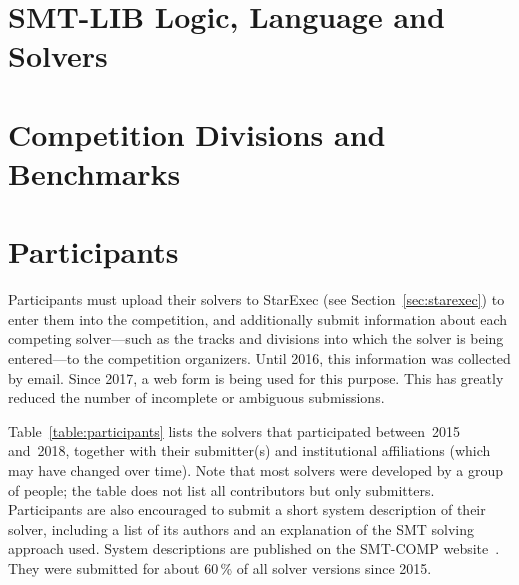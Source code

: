 \documentclass[twoside,11pt]{article}
\begin{document}
\section{SMT-LIB Logic, Language and Solvers}
\label{sec:context}


\section{Competition Divisions and Benchmarks}
\label{sec:benchmarks}


\section{Participants}
\label{sec:participants}

Participants must upload their solvers to StarExec (see
Section~\ref{sec:starexec}) to enter them into the competition, and
additionally submit information about each competing solver---such as
the tracks and divisions into which the solver is being entered---to
the competition organizers.  Until 2016, this information was
collected by email.  Since 2017, a web form is being used for this
purpose.  This has greatly reduced the number of incomplete or
ambiguous submissions.

Table~\ref{table:participants} lists the solvers that participated
between~2015 and~2018, together with their submitter(s) and
institutional affiliations (which may have changed over time).  Note
that most solvers were developed by a group of people; the table does
not list all contributors but only submitters.
%
Participants are also encouraged to submit a short system description
of their solver, including a list of its authors and an explanation of
the SMT solving approach used.  System descriptions are published on
the SMT-COMP website~\cite{smtcomp-web}.  They were submitted for
about 60\,\% of all solver versions since 2015.
\end{document}
